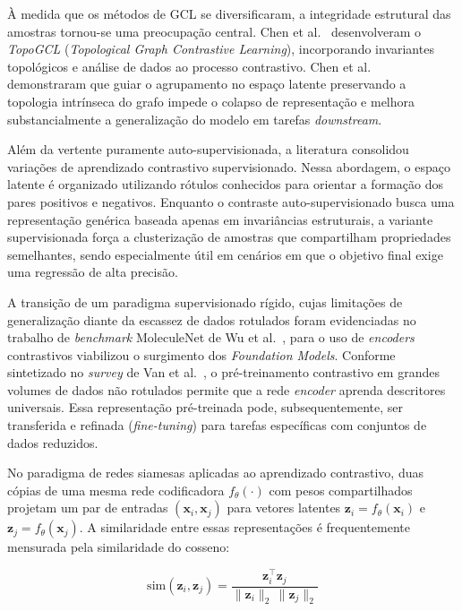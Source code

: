 À medida que os métodos de GCL se diversificaram, a integridade estrutural das amostras tornou-se uma preocupação central. Chen et al.~\cite{chen2024topogcl} desenvolveram o \textit{TopoGCL} (\textit{Topological Graph Contrastive Learning}), incorporando invariantes topológicos e análise de dados ao processo contrastivo. Chen et al.~\cite{chen2024topogcl} demonstraram que guiar o agrupamento no espaço latente preservando a topologia intrínseca do grafo impede o colapso de representação e melhora substancialmente a generalização do modelo em tarefas \textit{downstream}.

Além da vertente puramente auto-supervisionada, a literatura consolidou variações de aprendizado contrastivo supervisionado. Nessa abordagem, o espaço latente é organizado utilizando rótulos conhecidos para orientar a formação dos pares positivos e negativos. Enquanto o contraste auto-supervisionado busca uma representação genérica baseada apenas em invariâncias estruturais, a variante supervisionada força a clusterização de amostras que compartilham propriedades semelhantes, sendo especialmente útil em cenários em que o objetivo final exige uma regressão de alta precisão.

A transição de um paradigma supervisionado rígido, cujas limitações de generalização diante da escassez de dados rotulados foram evidenciadas no trabalho de \textit{benchmark} MoleculeNet de Wu et al.~\cite{wu2018moleculenet}, para o uso de \textit{encoders} contrastivos viabilizou o surgimento dos \textit{Foundation Models}. Conforme sintetizado no \textit{survey} de Van et al.~\cite{van2026survey}, o pré-treinamento contrastivo em grandes volumes de dados não rotulados permite que a rede \textit{encoder} aprenda descritores universais. Essa representação pré-treinada pode, subsequentemente, ser transferida e refinada (\textit{fine-tuning}) para tarefas específicas com conjuntos de dados reduzidos.

No paradigma de redes siamesas aplicadas ao aprendizado contrastivo, duas cópias de uma mesma rede codificadora $f_\theta(\cdot)$ com pesos compartilhados projetam um par de entradas $(\mathbf{x}_i, \mathbf{x}_j)$ para vetores latentes $\mathbf{z}_i = f_\theta(\mathbf{x}_i)$ e $\mathbf{z}_j = f_\theta(\mathbf{x}_j)$. A similaridade entre essas representações é frequentemente mensurada pela similaridade do cosseno:

\begin{equation}
    \text{sim}(\mathbf{z}_i, \mathbf{z}_j) = \frac{\mathbf{z}_i^\top \mathbf{z}_j}{\|\mathbf{z}_i\|_2 \, \|\mathbf{z}_j\|_2}
\end{equation}

